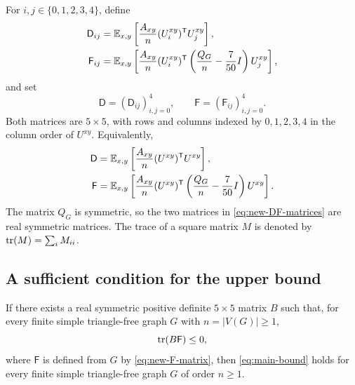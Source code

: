 For $i,j\in\{0,1,2,3,4\}$, define
\begin{align}
\mathsf D_{ij}
&=\mathbb E_{x,y}\left[\frac{A_{xy}}n
   (U_i^{xy})^{\mathsf T}U_j^{xy}\right],
\label{eq:new-D-entry}\\
\mathsf F_{ij}
&=\mathbb E_{x,y}\left[\frac{A_{xy}}n
   (U_i^{xy})^{\mathsf T}
   \left(\frac{Q_G}n-\frac7{50}I\right)U_j^{xy}\right],
\label{eq:new-F-entry}
\end{align}
and set
\begin{equation}\label{eq:new-DF-matrices}
\mathsf D=(\mathsf D_{ij})_{i,j=0}^4,
\qquad
\mathsf F=(\mathsf F_{ij})_{i,j=0}^4.
\end{equation}
Both matrices are $5\times5$, with rows and columns indexed by
$0,1,2,3,4$ in the column order of $U^{xy}$.
Equivalently,
\begin{align}
\mathsf D
&=\mathbb E_{x,y}\left[\frac{A_{xy}}n
   (U^{xy})^{\mathsf T}U^{xy}\right],
\label{eq:new-D-matrix}\\
\mathsf F
&=\mathbb E_{x,y}\left[\frac{A_{xy}}n
   (U^{xy})^{\mathsf T}
   \left(\frac{Q_G}n-\frac7{50}I\right)U^{xy}\right].
\label{eq:new-F-matrix}
\end{align}
The matrix $Q_G$ is symmetric, so the two matrices in
\eqref{eq:new-DF-matrices} are real symmetric matrices.
The trace of a square matrix $M$ is denoted by
$\operatorname{tr}(M)=\sum_i M_{ii}$.

\subsection{A sufficient condition for the upper bound}
\label{subsec:sufficient-condition}

\begin{lemma}\label{lem:sufficient-condition}
If there exists a real symmetric positive definite $5\times5$ matrix
$B$ such that, for every finite simple triangle-free graph $G$ with
$n=|V(G)|\geq1$,
\[
\operatorname{tr}(B\mathsf F)\leq0,
\]
where $\mathsf F$ is defined from $G$ by \eqref{eq:new-F-matrix},
then \eqref{eq:main-bound} holds for every finite simple triangle-free
graph $G$ of order $n\geq1$.
\end{lemma}

